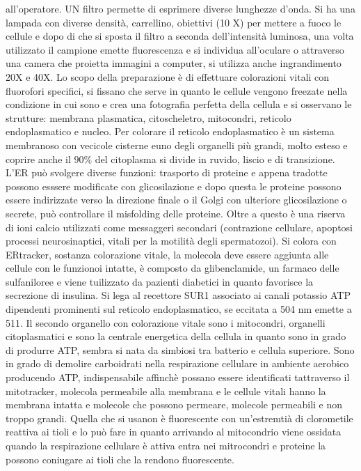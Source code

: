 all'operatore. UN filtro permette di esprimere diverse lunghezze d'onda. Si ha una lampada con diverse densit\`a, carrellino, obiettivi (10 X) per mettere a fuoco le cellule e dopo 
di che si sposta il filtro a seconda dell'intensit\`a luminosa, una volta utilizzato il campione emette fluorescenza e si individua all'oculare o attraverso una camera che proietta 
immagini a computer, si utilizza anche ingrandimento 20X e 40X. Lo scopo della preparazione \`e di effettuare colorazioni vitali con fluorofori specifici, si fissano che serve in quanto
le cellule vengono freezate nella condizione in cui sono e crea una fotografia perfetta della cellula e si osservano le strutture: membrana plasmatica, citoscheletro, mitocondri, reticolo
endoplasmatico e nucleo. Per colorare il reticolo endoplasmatico \`e un sistema membranoso con vecicole cisterne euno degli organelli pi\`u grandi, molto esteso e coprire anche il $90\%$ 
del citoplasma si divide in ruvido, liscio e di transizione. L'ER pu\`o svolgere diverse funzioni: trasporto di proteine e appena tradotte possono esssere modificate con glicosilazione
e dopo questa le proteine possono essere indirizzate verso la direzione finale o il Golgi con ulteriore glicosilazione o secrete, pu\`o controllare il misfolding delle proteine. Oltre
a questo \`e una riserva di ioni calcio utilizzati come messaggeri secondari (contrazione cellulare, apoptosi processi neurosinaptici, vitali per la motilit\`a degli spermatozoi). Si 
colora con ERtracker, sostanza colorazione vitale, la molecola deve essere aggiunta alle cellule con le funzionoi intatte, \`e composto da glibenclamide, un farmaco delle sulfaniloree e 
viene tuilizzato da pazienti diabetici in quanto favorisce la secrezione di insulina. Si lega al recettore SUR1 associato ai canali potassio ATP dipendenti prominenti sul reticolo 
endoplasmatico, se eccitata a 504 nm emette a 511. Il secondo organello con colorazione vitale sono i mitocondri, organelli citoplasmatici e sono la centrale energetica della cellula in
quanto sono in grado di produrre ATP, sembra si nata da simbiosi tra batterio e cellula superiore. Sono in grado di demolire carboidrati nella respirazione cellulare in ambiente aerobico 
producendo ATP, indispensabile affinch\`e possano essere identificati tattraverso il mitotracker, molecola permeabile alla membrana e le cellule vitali hanno la membrana intatta e 
molecole che possono permeare, molecole permeabili e non troppo grandi. Quella che si usanon \`e fluorescente con un'estremti\`a di clorometile reattiva ai tioli e lo pu\`o fare in
quanto arrivando al mitocondrio viene ossidata quando la respirazione cellulare \`e attiva entra nei mitrocondri e proteine la possono coniugare ai tioli che la rendono fluorescente. 

